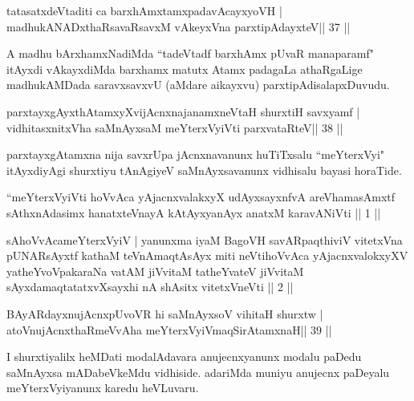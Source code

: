 \begin{shl}
tatasatxdeVtaditi ca barxhAmxtamxpadavAcayxyoVH |
madhukANADxthaRsavaRsavxM vAkeyxVna parxtipAdayxteV\hfill || 37 ||
\end{shl}

\begin{artha}
A madhu bArxhamxNadiMda ``tadeVtadf barxhAmx pUvaR manaparamf" itAyxdi vAkayxdiMda barxhamx matutx Atamx padagaLa athaRgaLige madhukAMDada saravxsavxvU (aMdare aikayxvu) parxtipAdisalapxDuvudu.
\end{artha}


\begin{shl}
parxtayxgAyxthAtamxyXvijAcnxnajanamxneV\s taH shurxtiH savxyamf |
vidhitasxnitxVha saMnAyxsaM meYterxVyiVti parxvataRteV\hfill || 38 ||
\end{shl}

\begin{artha}
parxtayxgAtamxna nija savxrUpa jAcnxnavanunx huTiTxsalu ``meYterxVyi" itAyxdiyAgi shurxtiyu tAnAgiyeV saMnAyxsavanunx vidhisalu bayasi horaTide.
\end{artha}


\begin{kandikeshl}
``meYterxVyiVti hoVvAca yAjacnxvalakxyX udAyxsayxnfvA 
areV\s hamasAmxtf sAthxnAdasimx hanatxteV\s nayA
kAtAyxyanAyx anatxM karavANiVti || 1 ||

sAhoVvAcameYterxVyiV | yanunxma iyaM BagoVH
savARpaqthiviV vitetxVna pUNARsAyxtf kathaM teVnA\s maqtAsAyx
miti neVtihoVvAca yAjacnxvalokxyXV yatheYvoVpakaraNa
vatAM jiVvitaM tatheYvateV jiVvitaM sAyxdamaqtatatxvXsayxhi nA shAsitx
vitetxVneVti || 2 ||
\end{kandikeshl}


\begin{shl}
BAyARdayxnujAcnxpUvoVR hi saMnAyxsoV vihitaH shurxtw |
atoV\s nujAcnxthaRmeVvA\s\s ha meYterxVyiVmaqSirAtamxnaH\hfill || 39 ||
\end{shl}

\begin{artha}
I shurxtiyalilx heMDati modalAdavara anujecnxyanunx modalu paDedu saMnAyxsa mADabeVkeMdu vidhiside. adariMda muniyu anujecnx paDeyalu meYterxVyiyanunx karedu heVLuvaru.
\end{artha}

